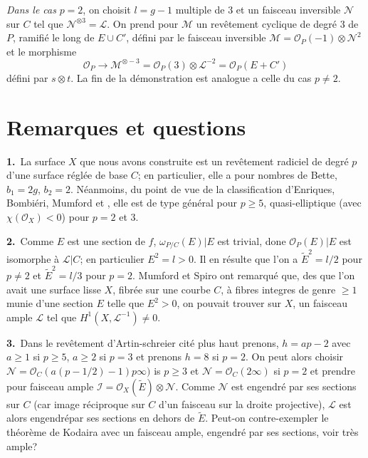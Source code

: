 {\em Dans le cas} $p=2$, on choisit $l=g-1$ multiple de 3 et un
faisceau inversible $\mathscr{N}$ sur $C$ tel que
$\mathscr{N}^{\otimes 3}=\mathscr{L}$. On prend pour $\mathscr{M}$ un
rev\^etement cyclique de degr\'e 3 de $P$, ramifi\'e le long de $E\cup
C'$, d\'efini par le faisceau inversible
$\mathscr{M}=\mathscr{O}_{P}(-1)\otimes \mathscr{N}^{2}$ et le
morphisme
$$
\mathscr{O}_{P}\to \mathscr{M}^{\otimes-3}=\mathscr{O}_{P}(3)\otimes \mathscr{L}^{-2}=\mathscr{O}_{P}(E+C') 
$$
d\'efini par $s\otimes t$. La fin de la d\'emonstration est analogue a
celle du cas $p\neq 2$.

\section{Remarques et questions}\label{art03-sec3}

{\bf 1.}~La surface $X$ que nous avons construite est un rev\^etement
radiciel de degr\'e $p$ d'une surface r\'egl\'ee de base $C$; en
particulier, elle a pour nombres de Bette, $b_{1}=2g$,
$b_{2}=2$. N\'eanmoins, du point de vue de la classification
d'Enriques, Bombi\'eri, Mumford \cite{art03-key1}
et \cite{art03-key4}, elle est de type g\'en\'eral pour $p\geq 5$,
quasi-elliptique (avec $\chi(\mathscr{O}_{X})<0$) pour $p=2$ et 3.

\medskip
\noindent
{\bf 2.}~Comme $E$ est une section de $f$, $\omega_{P/C}(E)|E$ est
trivial, done $\mathscr{O}_{P}(E)|E$  est isomorphe \`a $\mathscr{L}|C$; en
particulier $E^{2}=l>0$. Il en r\'esulte que l'on a
$\widetilde{E}^{2}=l/2$ pour $p\neq 2$ et $\widetilde{E}^{2}=l/3$ pour
$p=2$. Mumford et Spiro ont remarqu\'e que, des que l'on avait une
surface lisse $X$, fibr\'ee sur une courbe $C$, \`a fibres integres de
genre $\ge 1$ munie d'une section $E$ telle que $E^{2}>0$, on pouvait
trouver sur $X$, un faisceau ample $\mathscr{L}$ tel que
$H^{1}(X,\mathscr{L}^{-1})\neq 0$.

\medskip
\noindent
{\bf 3.}~Dans le rev\^etement d'Artin-schreier cit\'e plus haut
prenons, $h=ap-2$ avec $a\geq 1$ si $p\geq 5$, $a\geq 2$ si $p=3$ et
prenons $h=8$ si $p=2$. On peut alors choisir
$\mathscr{N}=\mathscr{O}_{C}(a(p-1/2)-1)p\infty)$ is $p\geq 3$ et
$\mathscr{N}=\mathscr{O}_{C}(2\infty)$ si $p=2$ et prendre pour
faisceau ample
$\mathscr{I}=\mathscr{O}_{X}(\widetilde{E})\otimes \mathscr{N}$. Comme
$\mathscr{N}$ est engendr\'e par ses sections sur $C$ (car image
r\'eciproque sur $C$ d'un faisceau sur la droite projective),
$\mathscr{L}$ est alors engendr\'e\pageoriginale par ses sections en
dehors de $\widetilde{E}$. Peut-on contre-exempler le th\'eor\`eme de
Kodaira avec un faisceau ample, engendr\'e par ses sections, voir
tr\`es ample?

